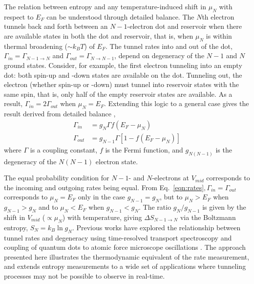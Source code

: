 \documentclass[twocolumn,showpacs,amsmath,amssymb,prl,aps,superscriptaddress]{revtex4-1}
\begin{document}
The relation between entropy and any temperature-induced shift in $\mu_{N}$ with respect to $E_F$ can be understood through detailed balance.  The $N$th electron tunnels back and forth between an $N-1$-electron dot and reservoir when there are available states in both the dot and reservoir, that is, when $\mu_{N}$ is within thermal broadening ($\sim k_B T$) of $E_F$.  The tunnel rates into and out of the dot, $\Gamma_{in}=\Gamma_{N-1\rightarrow N}$ and $\Gamma_{out}=\Gamma_{N\rightarrow N-1}$, depend on degeneracy of the $N-1$ and $N$ ground states. Consider, for example, the first electron tunneling into an empty dot: both spin-up and -down states are available on the dot.  Tunneling out, the electron (whether spin-up or -down) must tunnel into reservoir states with the same spin, that is, only half of the empty reservoir states are available.  As a result, $\Gamma_{in} = 2\Gamma_{out}$ when $\mu_{N}=E_F$.  Extending this logic to a general case gives the result derived from detailed balance \cite{Beenakker1991, Gustavsson2009}, 
%
\begin{align}
	\Gamma_{in} &=  g_{N} \Gamma f(E_F - \mu_{N}) \nonumber \\
	\Gamma_{out} &= g_{N-1} \Gamma [1 - f(E_F - \mu_{N})] \label{eqn:rates}
\end{align}
%
where $\Gamma$ is a coupling constant, $f$ is the Fermi function, and $g_{N(N-1)}$ is the degeneracy of the $N(N-1)$ electron state.

The equal probability condition for $N-1$- and $N$-electrons at $V_{mid}$ corresponds to the incoming and outgoing rates being equal. From Eq.~\ref{eqn:rates}$, \Gamma_{in} = \Gamma_{out}$ corresponds to $\mu_{N} = E_F$ only in the case $g_{N-1}=g_{N}$, but to $\mu_{N} > E_F$ when $g_{N-1} > g_{N}$ and to $\mu_{N} < E_F$ when $g_{N-1} < g_{N}$. The ratio $g_{N}/g_{N-1}$ is given by the shift in $V_{mid}$ ($\propto \mu_{N}$) with temperature, giving $\Delta S_{N-1\rightarrow N}$ via the Boltzmann entropy, $S_{N}=k_{B} \ln{g_N}$. Previous works have explored the relationship between tunnel rates and degeneracy using time-resolved transport spectroscopy and coupling of quantum dots to atomic force microscope oscillations \cite{Cockins2010, Bennett2010, Beckel2014, Hofmann2016}. The approach presented here illustrates the thermodynamic equivalent of the rate measurement, and extends entropy measurements to a wide set of applications where tunneling processes may not be possible to observe in real-time.

\end{document}
